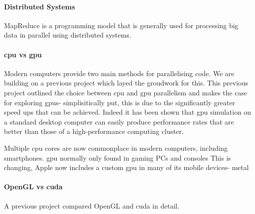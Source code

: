 \documentclass{UoYCSproject}
\begin{document}

\paragraph{Distributed Systems}
MapReduce is a programming model that is generally used for processing big data in parallel using distributed systems.

\paragraph{\acrshort{cpu} vs \acrshort{gpu}}
Modern computers provide two main methods for parallelising code.
We are building on a previous project\cite{phil_diss} which layed the groudwork for this.
This previous project outlined the choice between \acrshort{cpu} and \acrshort{gpu} parallelism and makes the case for exploring \acrshort{gpu}s- simplisitically put, this is due to the significantly greater speed ups that can be achieved. Indeed it has been shown that \acrshort{gpu} simulation on a standard desktop computer can easily produce performance rates that are better than those of a high-performance computing cluster\cite{flame_simulation}.

Multiple \acrshort{cpu} cores are now commonplace in modern computers, including smartphones.
\acrshort{gpu} normally only found in gaming PCs and consoles
This is changing, Apple now includes a custom \acrshort{gpu} in many of its mobile devices- metal



\paragraph{OpenGL vs \acrshort{cuda}}
A previous project compared OpenGL and \acrshort{cuda} in detail.
\end{document}
